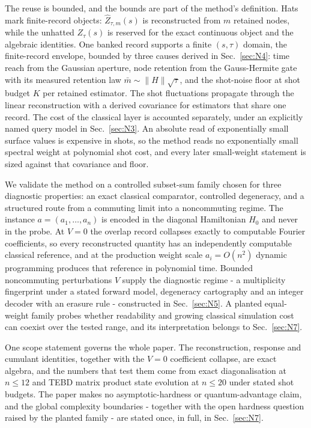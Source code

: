 The reuse is bounded, and the bounds are part of the method's definition. Hats mark finite-record objects: $\hat{Z}_{\tau,m}(s)$ is reconstructed from $m$ retained nodes, while the unhatted $Z_\tau(s)$ is reserved for the exact continuous object and the algebraic identities. One banked record supports a finite $(s, \tau)$ domain, the finite-record envelope, bounded by three causes derived in Sec.~\ref{sec:N4}: time reach from the Gaussian aperture, node retention from the Gauss-Hermite gate with its measured retention law $\bar{m} \sim \|H\|\sqrt{\tau}$, and the shot-noise floor at shot budget $K$ per retained estimator. The shot fluctuations propagate through the linear reconstruction with a derived covariance for estimators that share one record. The cost of the classical layer is accounted separately, under an explicitly named query model in Sec.~\ref{sec:N3}. An absolute read of exponentially small surface values is expensive in shots, so the method reads no exponentially small spectral weight at polynomial shot cost, and every later small-weight statement is sized against that covariance and floor.

We validate the method on a controlled subset-sum family chosen for three diagnostic properties: an exact classical comparator, controlled degeneracy, and a structured route from a commuting limit into a noncommuting regime. The instance $a = (a_1, \ldots, a_n)$ is encoded in the diagonal Hamiltonian $H_0$ and never in the probe. At $V = 0$ the overlap record collapses exactly to computable Fourier coefficients, so every reconstructed quantity has an independently computable classical reference, and at the production weight scale $a_i = O(n^2)$ dynamic programming produces that reference in polynomial time. Bounded noncommuting perturbations $V$ supply the diagnostic regime - a multiplicity fingerprint under a stated forward model, degeneracy cartography and an integer decoder with an erasure rule - constructed in Sec.~\ref{sec:N5}. A planted equal-weight family probes whether readability and growing classical simulation cost can coexist over the tested range, and its interpretation belongs to Sec.~\ref{sec:N7}.

One scope statement governs the whole paper. The reconstruction, response and cumulant identities, together with the $V = 0$ coefficient collapse, are exact algebra, and the numbers that test them come from exact diagonalisation at $n \le 12$ and TEBD matrix product state evolution at $n \le 20$ under stated shot budgets. The paper makes no asymptotic-hardness or quantum-advantage claim, and the global complexity boundaries - together with the open hardness question raised by the planted family - are stated once, in full, in Sec.~\ref{sec:N7}.

